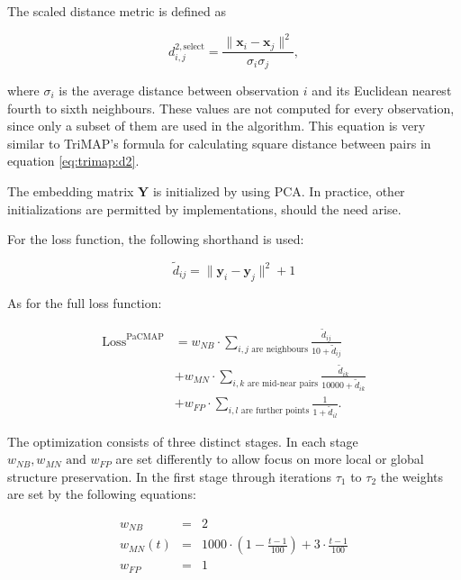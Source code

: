 The scaled distance metric is defined as

\begin{equation}
	\label{eq:pacmap:dselect}
	d^{2,\textrm{select}}_{i,j}=\frac{\|\mathbf{x}_{i}-\mathbf{x}_{j}\|^2}{\sigma_i \sigma_j},
\end{equation}

where $\sigma_i$ is the average distance between observation $i$ and its Euclidean nearest fourth to sixth neighbours. These values are not computed for every observation, since only a subset of them are used in the algorithm. This equation is very similar to TriMAP's formula for calculating square distance between pairs in equation \eqref{eq:trimap:d2}. 

The embedding matrix $\mathbf{Y}$ is initialized by using PCA. In practice, other initializations are permitted by implementations, should the need arise.

For the loss function, the following shorthand is used:

\begin{equation}
	\tilde{d}_{ij} = \|\mathbf{y}_i-\mathbf{y}_j\|^2+1
\end{equation}

As for the full loss function:

\begin{equation}
	\begin{aligned}
		\textrm{Loss}^{\textrm{PaCMAP}} &=
		w_{NB}\cdot\sum_{i,j \text{ are neighbours}}\frac{\tilde{d}_{ij}}{10 + \tilde{d}_{ij}} \\ 
		& + w_{MN}\cdot\sum_{i,k \text{ are mid-near pairs}}\frac{\tilde{d}_{ik}}{10000 + \tilde{d}_{ik}} \\
		& + w_{FP}\cdot\sum_{i,l \text{ are further points}}\frac{1}{1 + \tilde{d}_{il}}.    
	\end{aligned}
\end{equation}

The optimization consists of three distinct stages. In each stage $w_{NB}, w_{MN} \textrm{ and } w_{FP}$ are set differently to allow focus on more local or global structure preservation. In the first stage through iterations $\tau_1$ to $\tau_2$ the weights are set by the following equations:

\begin{equation}
	\begin{aligned}
		w_{NB} & = & 2 \\
		w_{MN}(t) & = & 1000\cdot\left( 1-\frac{t-1}{100} \right) + 3\cdot \frac{t-1}{100} \\
		w_{FP} & = & 1
	\end{aligned}
\end{equation}

